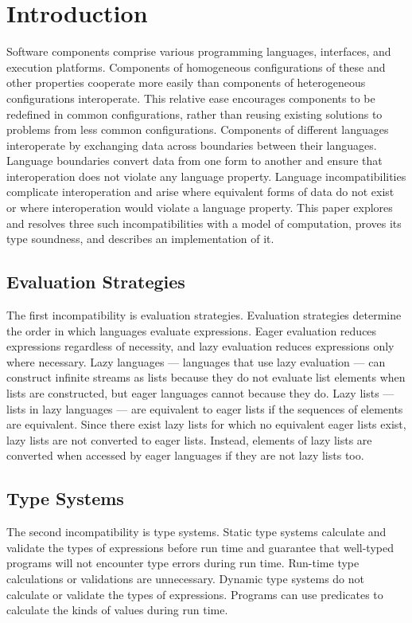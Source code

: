 \chapter{Introduction}

Software components comprise various programming languages, interfaces, and execution platforms.  Components of homogeneous configurations of these and other properties cooperate more easily than components of heterogeneous configurations interoperate.  This relative ease encourages components to be redefined in common configurations, rather than reusing existing solutions to problems from less common configurations.  Components of different languages interoperate by exchanging data across boundaries between their languages.  Language boundaries convert data from one form to another and ensure that interoperation does not violate any language property.  Language incompatibilities complicate interoperation and arise where equivalent forms of data do not exist or where interoperation would violate a language property.  This paper explores and resolves three such incompatibilities with a model of computation, proves its type soundness, and describes an implementation of it.

\section{Evaluation Strategies}

The first incompatibility is evaluation strategies.  Evaluation strategies determine the order in which languages evaluate expressions.  Eager evaluation reduces expressions regardless of necessity, and lazy evaluation reduces expressions only where necessary.  Lazy languages --- languages that use lazy evaluation --- can construct infinite streams as lists because they do not evaluate list elements when lists are constructed, but eager languages cannot because they do.  Lazy lists --- lists in lazy languages --- are equivalent to eager lists if the sequences of elements are equivalent.  Since there exist lazy lists for which no equivalent eager lists exist, lazy lists are not converted to eager lists.  Instead, elements of lazy lists are converted when accessed by eager languages if they are not lazy lists too.

\section{Type Systems}

The second incompatibility is type systems.  Static type systems calculate and validate the types of expressions before run time and guarantee that well-typed programs will not encounter type errors during run time.  Run-time type calculations or validations are unnecessary.  Dynamic type systems do not calculate or validate the types of expressions.  Programs can use predicates to calculate the kinds of values during run time.

